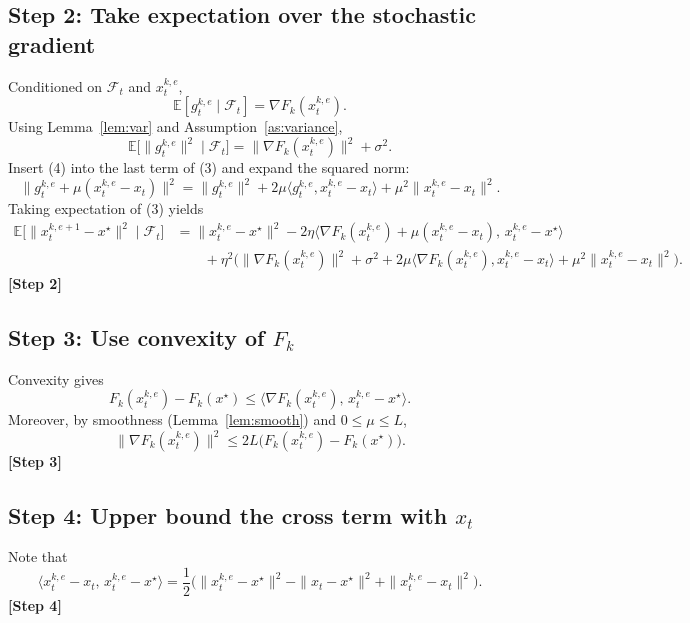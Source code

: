 \documentclass[11pt]{article}
\begin{document}
\subsection*{Step 2: Take expectation over the stochastic gradient}
Conditioned on $\mathcal{F}_t$ and $x_{t}^{k,e}$,
\[
\mathbb{E}[g_{t}^{k,e}\mid\mathcal{F}_t]=\nabla F_k(x_{t}^{k,e}).
\]
Using Lemma~\ref{lem:var} and Assumption~\ref{as:variance},
\[
\mathbb{E}\big[\|g_{t}^{k,e}\|^2\mid\mathcal{F}_t\big]
= \|\nabla F_k(x_{t}^{k,e})\|^2 + \sigma^2 .
\tag{4}
\]
Insert (4) into the last term of (3) and expand the squared norm:
\[
\|g_{t}^{k,e}+ \mu(x_{t}^{k,e}-x_t)\|^2
= \|g_{t}^{k,e}\|^2
+2\mu\langle g_{t}^{k,e},x_{t}^{k,e}-x_t\rangle
+\mu^2\|x_{t}^{k,e}-x_t\|^2 .
\tag{5}
\]
Taking expectation of (3) yields
\begin{align}
\mathbb{E}\big[\|x_{t}^{k,e+1}-x^\star\|^2\mid\mathcal{F}_t\big]
&= \|x_{t}^{k,e}-x^\star\|^2
-2\eta\big\langle \nabla F_k(x_{t}^{k,e})+ \mu(x_{t}^{k,e}-x_t),\,x_{t}^{k,e}-x^\star\big\rangle \nonumber\\
&\qquad
+\eta^2\Big(\|\nabla F_k(x_{t}^{k,e})\|^2+\sigma^2
+2\mu\langle \nabla F_k(x_{t}^{k,e}),x_{t}^{k,e}-x_t\rangle
+\mu^2\|x_{t}^{k,e}-x_t\|^2\Big).
\tag{6}
\end{align}
\textbf{[Step 2]}

\subsection*{Step 3: Use convexity of $F_k$}
Convexity gives
\[
F_k(x_{t}^{k,e})-F_k(x^\star)
\le \langle\nabla F_k(x_{t}^{k,e}),\,x_{t}^{k,e}-x^\star\rangle .
\tag{7}
\]
Moreover, by smoothness (Lemma~\ref{lem:smooth}) and $0\le\mu\le L$,
\[
\|\nabla F_k(x_{t}^{k,e})\|^2
\le 2L\big(F_k(x_{t}^{k,e})-F_k(x^\star)\big) .
\tag{8}
\]
\textbf{[Step 3]}

\subsection*{Step 4: Upper bound the cross term with $x_t$}
Note that
\[
\langle x_{t}^{k,e}-x_t,\,x_{t}^{k,e}-x^\star\rangle
= \frac{1}{2}\Big(\|x_{t}^{k,e}-x^\star\|^2-\|x_t-x^\star\|^2
+\|x_{t}^{k,e}-x_t\|^2\Big).
\tag{9}
\]
\textbf{[Step 4]}
\end{document}
